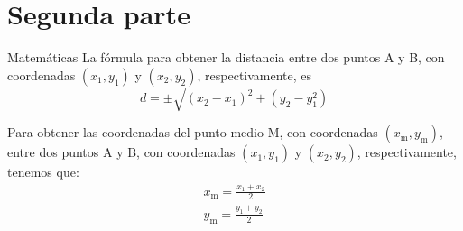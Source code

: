 \documentclass[spanish,mexico]{beamer}
\begin{document}
	\section{Segunda parte}
	\begin{frame}{Matemáticas}
		La fórmula para obtener la distancia entre dos puntos A y B, con coordenadas \((x_1, y_1)\) y \((x_2, y_2)\), respectivamente, es 
		\begin{equation}
		d=\pm\sqrt{(x_{2}-x_{1})^2+(y_{2}-y_{1}^2)}
		\end{equation}
		
		Para obtener las coordenadas del punto medio M, con coordenadas \((x_\mathrm{m}, y_\mathrm{m})\),  entre dos puntos A y B, con coordenadas \((x_1, y_1)\) y \((x_2, y_2)\), respectivamente, tenemos que:
		\begin{align}
			x_\mathrm{m} = \frac{x_1+x_2}{2} \\
			y_\mathrm{m} = \frac{y_1+y_2}{2} 
		\end{align}
	\end{frame}
\end{document}
